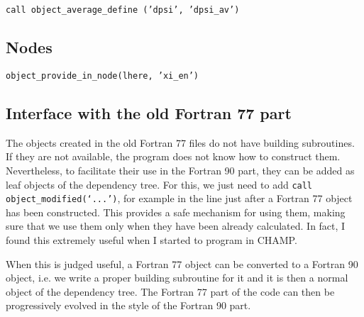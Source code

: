 \documentclass[a4paper,11pt]{article}
\begin{document}
\vspace{0.5cm}
\noindent
{\tt call object\_average\_define ('dpsi', 'dpsi_av')}


\subsection{Nodes}

\vspace{0.5cm}
\noindent
{\tt object_provide_in_node(lhere, 'xi_en')}


\subsection{Interface with the old Fortran 77 part}

The objects created in the old Fortran 77 files do not have building subroutines. If they are not available, the program does not know how to construct them. Nevertheless, to facilitate their use in the Fortran 90 part, they can be added as leaf objects of the dependency tree. For this, we just need to add {\tt call object\_modified(`...')}, for example in the line just after a Fortran 77 object has been constructed. This provides a safe mechanism for using them, making sure that we use them only when they have been already calculated. In fact, I found this extremely useful when I started to program in CHAMP. 

When this is judged useful, a Fortran 77 object can be converted to a Fortran 90 object, i.e. we write a proper building subroutine for it and it is then a normal object of the dependency tree. The Fortran 77 part of the code can then be progressively evolved in the style of the Fortran 90 part.



{}


\end{document}

